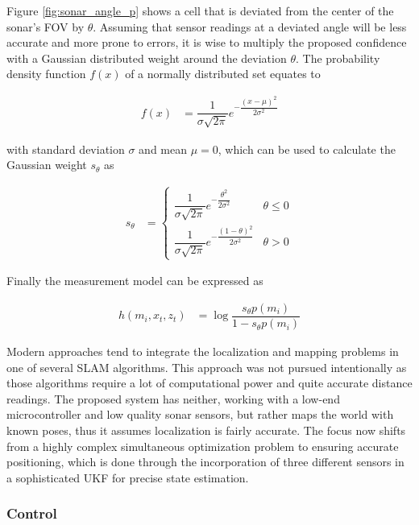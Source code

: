 Figure \ref{fig:sonar_angle_p} shows a cell that is deviated from the center of the sonar's FOV by $\theta$. Assuming that sensor readings at a deviated angle will be less accurate and more prone to errors, it is wise to multiply the proposed confidence with a Gaussian distributed weight around the deviation $\theta$. The probability density function $f(x)$ of a normally distributed set equates to

\begin{align}
    f(x) &= \dfrac{1}{\sigma\sqrt{2\pi}} e^{-\dfrac{(x - \mu)^2}{2\sigma^2}}
\end{align}

with standard deviation $\sigma$ and mean $\mu = 0$, which can be used to calculate the Gaussian weight $s_\theta$ as

\begin{align}
    s_\theta &= \left\{ \begin{array}{ll}
        \dfrac{1}{\sigma\sqrt{2\pi}} e^{-\dfrac{\theta^2}{2\sigma^2}} & \theta \leq 0 \\
        \dfrac{1}{\sigma\sqrt{2\pi}} e^{-\dfrac{(1 - \theta)^2}{2\sigma^2}} & \theta > 0
    \end{array}
    \right.
\end{align}

Finally the measurement model can be expressed as

\begin{align}
    h(m_i, x_t, z_t) &= \log \dfrac{s_\theta p(m_i)}{1 - s_\theta p(m_i)}
\end{align}

Modern approaches tend to integrate the localization and mapping problems in one of several SLAM algorithms. This approach was not pursued intentionally as those algorithms require a lot of computational power and quite accurate distance readings. The proposed system has neither, working with a low-end microcontroller and low quality sonar sensors, but rather maps the world with known poses, thus it assumes localization is fairly accurate. The focus now shifts from a highly complex simultaneous optimization problem to ensuring accurate positioning, which is done through the incorporation of three different sensors in a sophisticated UKF for precise state estimation.

\subsubsection{Control}
\label{sec:control}

